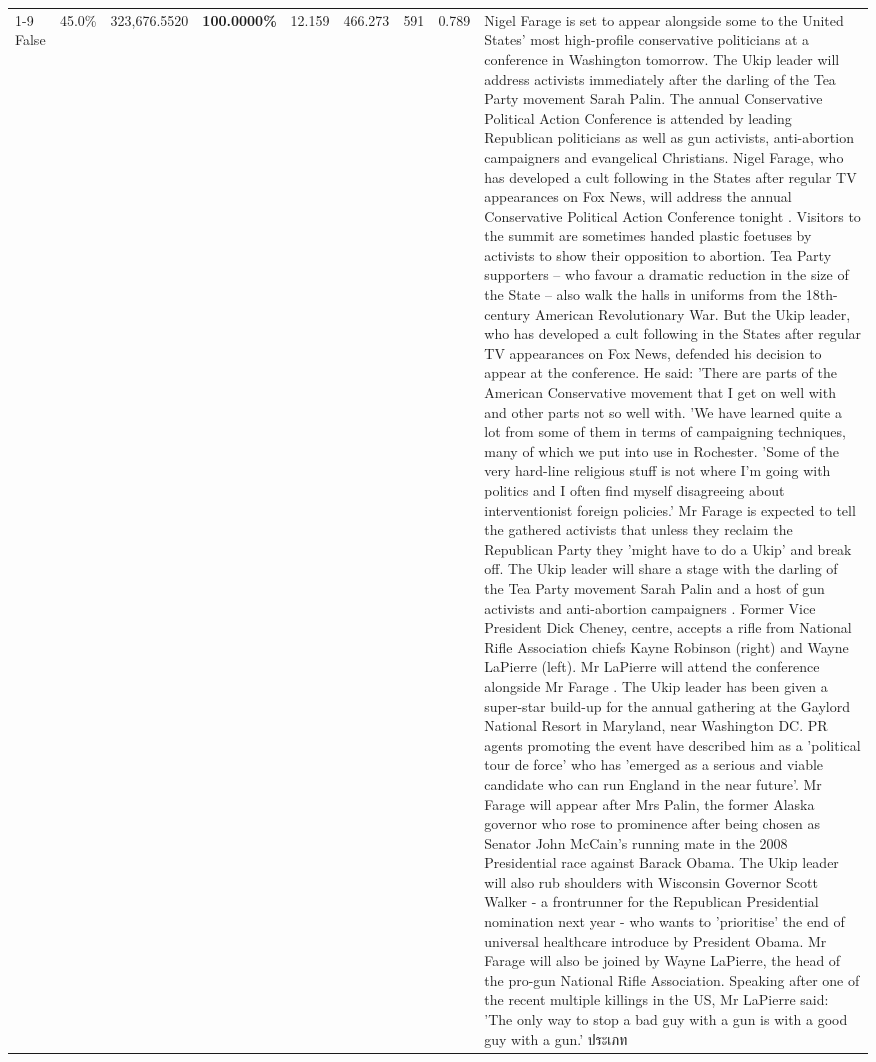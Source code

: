 \begin{table}[H]
\begin{tabular}{lllrlllll}
\cline{1-9}
False & 45.0\% & 323,676.5520 & \bfseries \color{red} 100.0000\% & 12.159 & 466.273 & 591 & 0.789 & Nigel Farage is set to appear alongside some to the United States' most high-profile conservative politicians at a conference in Washington tomorrow. The Ukip leader will address activists immediately after the darling of the Tea Party movement Sarah Palin. The annual Conservative Political Action Conference is attended by leading Republican politicians as well as gun activists, anti-abortion campaigners and evangelical Christians. Nigel Farage, who has developed a cult following in the States after regular TV appearances on Fox News, will address the annual Conservative Political Action Conference tonight . Visitors to the summit are sometimes handed plastic foetuses by activists to show their opposition to abortion. Tea Party supporters – who favour a dramatic reduction in the size of the State – also walk the halls in uniforms from the 18th-century American Revolutionary War. But the Ukip leader, who has developed a cult following in the States after regular TV appearances on Fox News, defended his decision to appear at the conference. He said: 'There are parts of the American Conservative movement that I get on well with and other parts not so well with. 'We have learned quite a lot from some of them in terms of campaigning techniques, many of which we put into use in Rochester. 'Some of the very hard-line religious stuff is not where I'm going with politics and I often find myself disagreeing about interventionist foreign policies.' Mr Farage is expected to tell the gathered activists that unless they reclaim the Republican Party they 'might have to do a Ukip' and break off. The Ukip leader will share a stage with the darling of the Tea Party movement Sarah Palin and a host of gun activists and anti-abortion campaigners . Former Vice President Dick Cheney, centre, accepts a rifle from National Rifle Association chiefs Kayne Robinson (right) and Wayne LaPierre (left). Mr LaPierre will attend the conference alongside Mr Farage . The Ukip leader has been given a super-star build-up for the annual gathering at the Gaylord National Resort in Maryland, near Washington DC. PR agents promoting the event have described him as a 'political tour de force' who has 'emerged as a serious and viable candidate who can run England in the near future'. Mr Farage will appear after Mrs Palin, the former Alaska governor who rose to prominence after being chosen as Senator John McCain's running mate in the 2008 Presidential race against Barack Obama. The Ukip leader will also rub shoulders with Wisconsin Governor Scott Walker - a frontrunner for the Republican Presidential nomination next year - who wants to 'prioritise' the end of universal healthcare introduce by President Obama. Mr Farage will also be joined by Wayne LaPierre, the head of the pro-gun National Rifle Association. Speaking after one of the recent multiple killings in the US, Mr LaPierre said: 'The only way to stop a bad guy with a gun is with a good guy with a gun.' ประเภท \\

\end{tabular}
\end{table}
